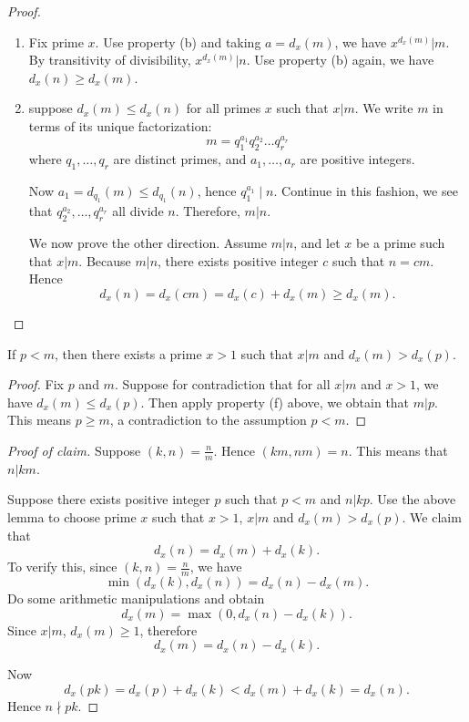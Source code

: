 \begin{enumerate}
\begin{proof}
\begin{enumerate}
			We have ruled out all other possibilities, so $d_x(m,n) = d_x(m) = \min(d_x(m), d_x(n))$.
			\item Fix prime $x$. Use property (b) and taking $a = d_x(m)$, we have $x^{d_x(m)} | m$. By transitivity of divisibility, $x^{d_x(m)} | n$. Use property (b) again, we have $d_x(n) \ge  d_x(m)$.
			\item suppose $d_x(m) \le  d_x(n)$ for all primes $x$ such that $x | m$. We write $m$ in terms of its unique factorization:
		\[
			m = q_1^{a_1}q_2^{a_2}\ldots q_r^{a_r}
		\] 
		where $q_1, \ldots, q_r$ are distinct primes, and $a_1, \ldots, a_r$ are positive integers. 

		Now $a_1 = d_{q_1}(m) \le  d_{q_1}(n)$, hence $q_1^{a_1} \mid n$. Continue in this fashion, we see that $q_2^{a_2},\ldots,  q_r^{a_r}$ all divide $n$. Therefore,  $m | n$.

		We now prove the other direction. Assume $m | n$, and let $x $ be a prime such that $x | m$. Because $m|n$, there exists positive integer $c$ such that $n = cm$. Hence \[
			d_x(n) = d_x(cm) = d_x(c) + d_x(m)\ge d_x(m)
		.\] 
		\end{enumerate}
	\end{proof}
	
	\begin{lemma}
	If $p < m$, then there exists a prime $x>1$ such that $x|m $ and $d_x(m) > d_x(p)$.
	\end{lemma}
	\begin{proof}
		Fix $p$ and $m$. Suppose for contradiction that for all $x | m$ and $x>1$, we have $d_x(m) \le d_x(p)$. Then apply property (f) above, we obtain that $m | p$. This means $p \ge m$, a contradiction to the assumption $p < m$.
	\end{proof}
	
	
	\begin{proof}[\color{blue}Proof of claim]
	Suppose $(k,n) = \frac{n}{m}$. Hence $(km, nm) = n$. This means that $n |km $.  

	Suppose there exists positive integer $p$ such that  $ p<m$ and $n | k p$. Use the above lemma to choose prime $x$ such that  $x>1$, $x|m$ and $d_x(m) > d_x(p)$. We claim that \[
		d_x(n) = d_x(m) + d_x(k)
	.\] 
	To verify this, since $(k,n) = \frac{n}{m}$, we have \[
		\min\left( d_x(k), d_x(n) \right) = d_x(n) - d_x(m)
	.\] 
	Do some arithmetic manipulations and obtain \[
		d_x(m) = \max(0,d_x(n) - d_x(k))
	.\] 
	Since $x | m$, $d_x(m) \ge 1$, therefore \[
		d_x(m) = d_x(n) - d_x(k)
	.\] 

	Now \[
		d_x(pk) = d_x(p) + d_x(k) < d_x(m) + d_x(k) = d_x(n)
	.\] 
	Hence $n \nmid pk $.


\end{proof}
\end{enumerate}
